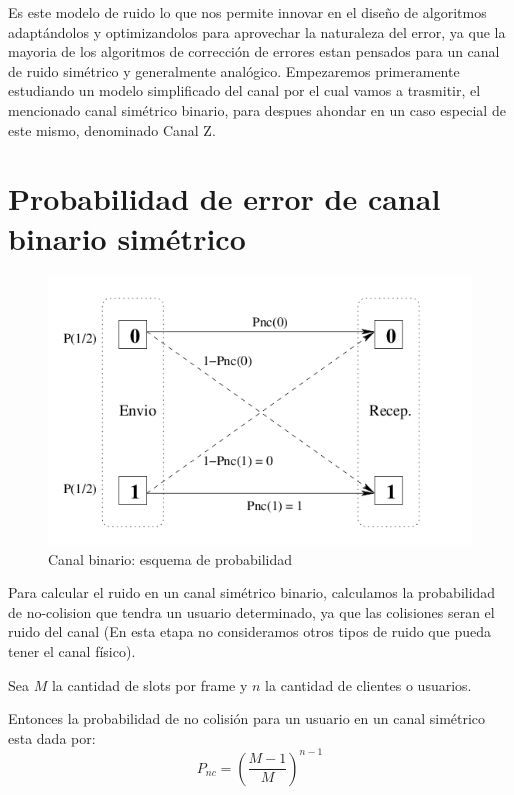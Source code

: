 Es este modelo de ruido lo que nos permite innovar en el diseño de algoritmos adaptándolos y optimizandolos para aprovechar la naturaleza del error, ya que la mayoria de los algoritmos de corrección de errores estan pensados para un canal de ruido simétrico y generalmente analógico.
Empezaremos primeramente estudiando un modelo simplificado del canal por el cual vamos a trasmitir, el mencionado canal simétrico binario, para despues ahondar en un caso especial de este mismo, denominado Canal Z.

\section{Probabilidad de error de canal binario simétrico}
\begin{figure}[t]
  \begin{center}
    \includegraphics[scale=0.43]{capacidad/canalBinario.png}
  \end{center}
\caption {Canal binario: esquema de probabilidad}
\label{fig:canbin}
\end{figure}

Para calcular el ruido en un canal simétrico binario, calculamos la probabilidad de no-colision que tendra un usuario determinado, ya que las colisiones seran el ruido del canal (En esta etapa no consideramos otros tipos de ruido que pueda tener el canal físico).

Sea $M$ la cantidad de slots por frame y $n$ la cantidad de clientes o usuarios.

Entonces la probabilidad de no colisión para un usuario en un canal simétrico esta dada por:
\begin{equation}
P_{nc}=\left(\frac{M-1}{M}\right)^{n-1}
\end{equation}


